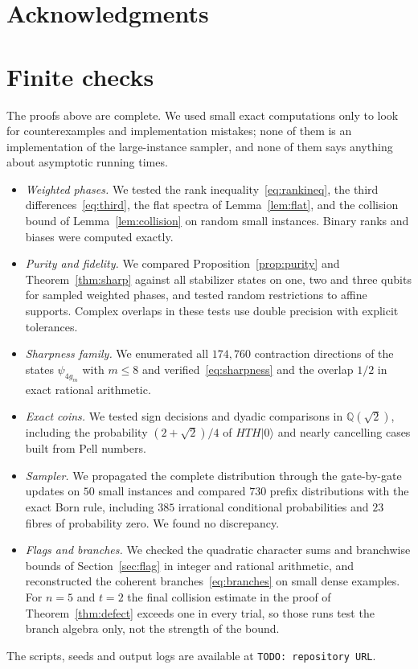 \documentclass[a4paper,onecolumn,11pt,unpublished]{quantumarticle}
\theoremstyle{plain}
\theoremstyle{remark}
\newcommand{\ket}[1]{|#1\rangle}
\begin{document}
\section*{Acknowledgments}

\appendix

\section{Finite checks}\label{app:checks}

The proofs above are complete. We used small exact computations only to look for counterexamples and implementation mistakes; none of them is an implementation of the large-instance sampler, and none of them says anything about asymptotic running times.
\begin{itemize}
\item \emph{Weighted phases.} We tested the rank inequality~\eqref{eq:rankineq}, the third differences~\eqref{eq:third}, the flat spectra of Lemma~\ref{lem:flat}, and the collision bound of Lemma~\ref{lem:collision} on random small instances. Binary ranks and biases were computed exactly.
\item \emph{Purity and fidelity.} We compared Proposition~\ref{prop:purity} and Theorem~\ref{thm:sharp} against all stabilizer states on one, two and three qubits for sampled weighted phases, and tested random restrictions to affine supports. Complex overlaps in these tests use double precision with explicit tolerances.
\item \emph{Sharpness family.} We enumerated all $174{,}760$ contraction directions of the states $\psi_{4g_m}$ with $m\le8$ and verified~\eqref{eq:sharpness} and the overlap $1/2$ in exact rational arithmetic.
\item \emph{Exact coins.} We tested sign decisions and dyadic comparisons in $\mathbb{Q}(\sqrt2)$, including the probability $(2+\sqrt2)/4$ of $HTH\ket0$ and nearly cancelling cases built from Pell numbers.
\item \emph{Sampler.} We propagated the complete distribution through the gate-by-gate updates on $50$ small instances and compared $730$ prefix distributions with the exact Born rule, including $385$ irrational conditional probabilities and $23$ fibres of probability zero. We found no discrepancy.
\item \emph{Flags and branches.} We checked the quadratic character sums and branchwise bounds of Section~\ref{sec:flag} in integer and rational arithmetic, and reconstructed the coherent branches~\eqref{eq:branches} on small dense examples. For $n=5$ and $t=2$ the final collision estimate in the proof of Theorem~\ref{thm:defect} exceeds one in every trial, so those runs test the branch algebra only, not the strength of the bound.
\end{itemize}
The scripts, seeds and output logs are available at \texttt{TODO: repository URL}.
\end{document}
